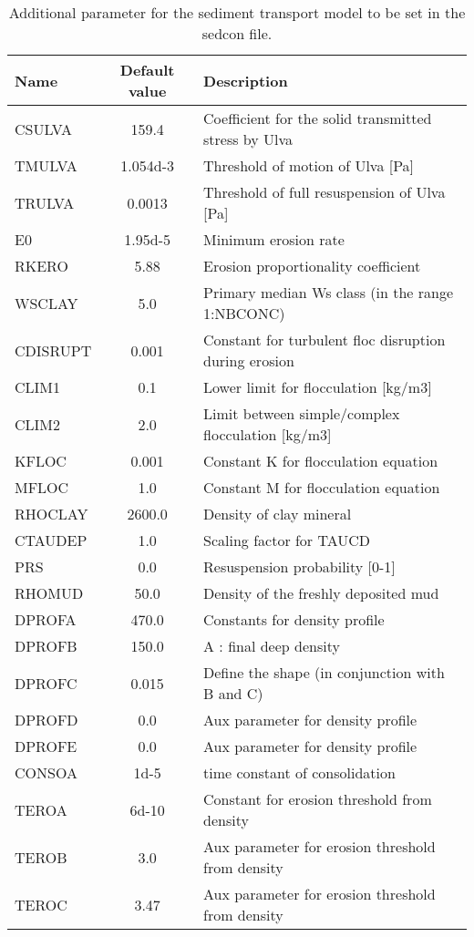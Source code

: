\begin{table}[ht]
\caption{Additional parameter for the sediment transport model to be set
in the sedcon file.}
\begin{tabular}{lcl} \hline
Name & Default value & Description \\ \hline
CSULVA  & 159.4 & Coefficient for the solid transmitted stress by Ulva \\
TMULVA  & 1.054d-3 & Threshold of motion of Ulva [Pa] \\
TRULVA  & 0.0013 & Threshold of full resuspension of Ulva [Pa] \\
E0      & 1.95d-5 & Minimum erosion rate \\
RKERO   & 5.88 & Erosion proportionality coefficient \\
WSCLAY  & 5.0 & Primary median Ws class (in the range 1:NBCONC) \\
CDISRUPT& 0.001 & Constant for turbulent floc disruption during erosion \\
CLIM1   & 0.1 & Lower limit for flocculation [kg/m3] \\
CLIM2   & 2.0 & Limit between simple/complex flocculation [kg/m3] \\
KFLOC   & 0.001 & Constant K for flocculation equation \\
MFLOC   & 1.0 & Constant M for flocculation equation \\
RHOCLAY & 2600.0 &  Density of clay mineral \\
CTAUDEP & 1.0 & Scaling factor for TAUCD \\
PRS     & 0.0 & Resuspension probability [0-1] \\
RHOMUD  & 50.0 & Density of the freshly deposited mud \\
DPROFA  & 470.0 & Constants for density profile \\
DPROFB  & 150.0 & A : final deep density \\
DPROFC  & 0.015 & Define the shape (in conjunction with B and C) \\
DPROFD  & 0.0 & Aux parameter for density profile \\
DPROFE  & 0.0 & Aux parameter for density profile \\
CONSOA  & 1d-5 & time constant of consolidation \\
TEROA   & 6d-10 & Constant for erosion threshold from density \\
TEROB   & 3.0 & Aux parameter for erosion threshold from density \\
TEROC   & 3.47 & Aux parameter for erosion threshold from density \\

\end{tabular}
\end{table}
